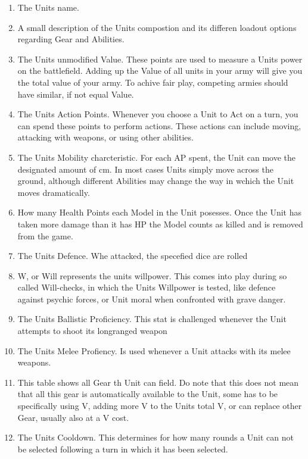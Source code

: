 \documentclass[a4paper,14pt]{book}
\begin{document}
\begin{adjustwidth}{-3cm}{-3cm}
\begin{multicols}{2}
\begin{enumerate}

	\item The Units name. 
	\item A small description of the Units compostion and its differen loadout options regarding Gear and Abilities.
	\item The Units unmodified Value. These points are used to measure a Units power on the battlefield. Adding up the Value of all units in your army will give you the total value of your army. To achive fair play, competing armies should have similar, if not equal Value.
	\item The Units Action Points. Whenever you choose a Unit to Act on a turn, you can spend these points to perform actions. These actions can include moving, attacking with weapons, or using other abilities.
	\item The Units Mobility charcteristic. For each AP spent, the Unit can move the designated amount of cm. In most cases Units simply move across the ground, although different Abilities may change the way in wchich the Unit moves dramatically.
	\item How many Health Points each Model in the Unit posesses. Once the Unit has taken more damage than it has HP the Model counts as killed and is removed from the game.
	\item The Units Defence. Whe attacked, the specefied dice are rolled
	\item W, or Will represents the units willpower. This comes into play during so called Will-checks, in which the Units Willpower is tested, like defence against psychic forces, or Unit moral when confronted with grave danger.
	\item The Units Ballistic Proficiency. This stat is challenged whenever the Unit attempts to shoot its longranged weapon
	\item The Units Melee Profiency. Is used whenever a Unit attacks with its melee weapons.
	\item This table shows all Gear th Unit can field. Do note that this does not mean that all this gear is automatically available to the Unit, some has to be specifically  using V, adding more V to the Units total V, or can replace other Gear, usually also at a V cost.
	\item The Units Cooldown. This determines for how many rounds a Unit can not be selected following a turn in which it has been selected.

\end{enumerate}
\end{multicols}
\end{adjustwidth}
\end{document}
